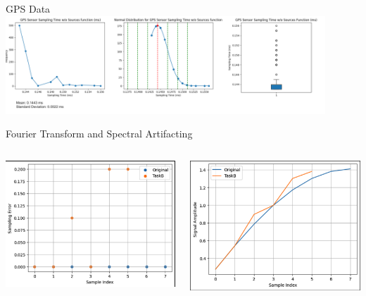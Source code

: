\begin{frame}{GPS Data}
    \centering
    \includegraphics[height=0.9\textheight,width=0.9\textwidth,keepaspectratio]{images/gpsdata.png}
\end{frame}



\begin{frame}{Fourier Transform and Spectral Artifacting}
    \begin{columns}
        \begin{column}{0.5\textwidth}
            \includegraphics[height=1\textheight,width=1\textwidth,keepaspectratio]{images/Sampling_Error.png}
        \end{column}
        \begin{column}{0.5\textwidth}
            \includegraphics[height=1\textheight,width=1\textwidth,keepaspectratio]{images/Signal_Diff.png}
        \end{column}
    \end{columns}
\end{frame}

